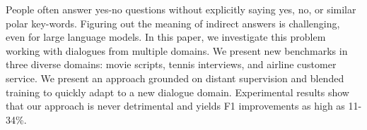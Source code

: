 People often answer yes-no questions without explicitly saying yes, no, or similar polar key-words. Figuring out the meaning of indirect answers is challenging, even for large language models. In this paper, we investigate this problem working with dialogues from multiple domains. We present new benchmarks in three diverse domains: movie scripts, tennis interviews, and airline customer service. We present an approach grounded on distant supervision and blended training to quickly adapt to a new dialogue domain. Experimental results show that our approach is never detrimental and yields F1 improvements as high as 11-34\%.